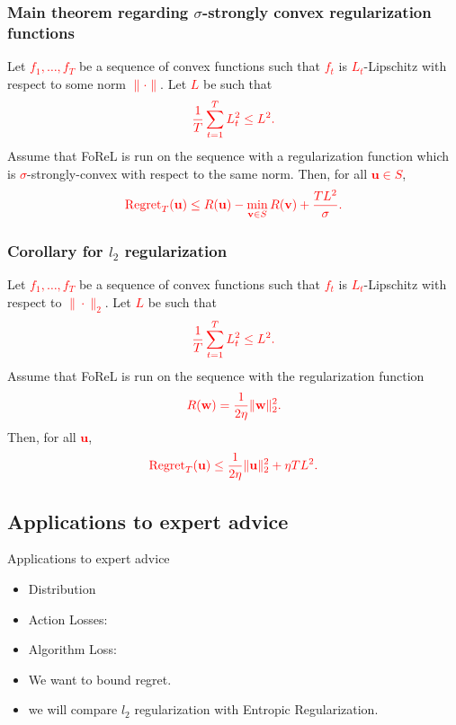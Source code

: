 \documentclass[handout]{beamer}
\begin{document}
\begin{frame}
    \frametitle{Main theorem regarding $\sigma$-strongly convex regularization functions}
    Let 
    \textcolor{red}{$f_1, \dots, f_T$} 
    be a sequence of convex functions such that 
    \textcolor{red}{$f_t$} 
    is 
    \textcolor{red}{$L_t$}-Lipschitz 
    with respect to some norm \textcolor{red}{$\|\cdot\|$}. Let 
    \textcolor{red}{$L$} 
    be such that 
    \[
    \textcolor{red}{\frac{1}{T} \sum_{t=1}^{T} L_t^2 \leq L^2.}
    \]
    Assume that FoReL is run on the sequence with a regularization function which is 
    \textcolor{red}{$\sigma$}-strongly-convex 
    with respect to the same norm. Then, for all 
    \textcolor{red}{$\mathbf{u} \in S$},
    \[
    \textcolor{red}{\operatorname{Regret}_T(\mathbf{u}) \leq R(\mathbf{u}) - \min_{\mathbf{v} \in S} R(\mathbf{v}) + \frac{T L^2}{\sigma}.}
    \]
\end{frame}

\begin{frame}
    \frametitle{Corollary for $l_2$ regularization}
    Let 
    \textcolor{red}{$f_1, \dots, f_T$} 
    be a sequence of convex functions such that 
    \textcolor{red}{$f_t$} 
    is 
    \textcolor{red}{$L_t$}-Lipschitz 
    with respect to \textcolor{red}{$\|\cdot\|_2$}. Let 
    \textcolor{red}{$L$} 
    be such that 
    \[
    \textcolor{red}{\frac{1}{T} \sum_{t=1}^{T} L_t^2 \leq L^2.}
    \]
    Assume that FoReL is run on the sequence with the regularization function 
    \[
    \textcolor{red}{R(\mathbf{w}) = \frac{1}{2\eta} \|\mathbf{w}\|_2^2.}
    \]
    Then, for all \textcolor{red}{$\mathbf{u}$},
    \[
    \textcolor{red}{\operatorname{Regret}_T(\mathbf{u}) \leq \frac{1}{2\eta} \|\mathbf{u}\|_2^2 + \eta T L^2.}
    \]
\end{frame}

\subsection{Applications to expert advice}

\begin{frame}{Applications to expert advice}
  \begin{itemize}
    \item Distribution 
    \item Action Losses: 
    \item Algorithm Loss: 
    \item We want to bound regret.
    \item we will compare $l_2$ regularization with Entropic
      Regularization.
  \end{itemize}
\end{frame}
\end{document}
